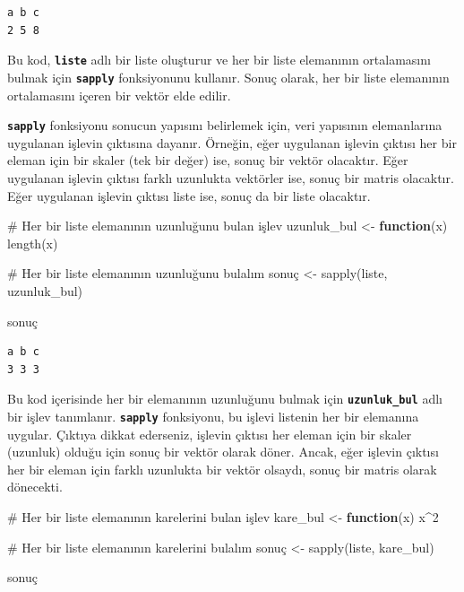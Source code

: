 \documentclass[
  letterpaper,
  DIV=11,
  numbers=noendperiod]{scrreprt}
\newenvironment{Shaded}{\begin{snugshade}}{\end{snugshade}}
\newcommand{\CommentTok}[1]{\textcolor[rgb]{0.37,0.37,0.37}{#1}}
\newcommand{\ControlFlowTok}[1]{\textcolor[rgb]{0.00,0.23,0.31}{\textbf{#1}}}
\newcommand{\DecValTok}[1]{\textcolor[rgb]{0.68,0.00,0.00}{#1}}
\newcommand{\FunctionTok}[1]{\textcolor[rgb]{0.28,0.35,0.67}{#1}}
\newcommand{\NormalTok}[1]{\textcolor[rgb]{0.00,0.23,0.31}{#1}}
\newcommand{\OtherTok}[1]{\textcolor[rgb]{0.00,0.23,0.31}{#1}}
\newcommand{\SpecialCharTok}[1]{\textcolor[rgb]{0.37,0.37,0.37}{#1}}
\begin{document}
\begin{verbatim}
a b c 
2 5 8 
\end{verbatim}

Bu kod, \textbf{\texttt{liste}} adlı bir liste oluşturur ve her bir
liste elemanının ortalamasını bulmak için \textbf{\texttt{sapply}}
fonksiyonunu kullanır. Sonuç olarak, her bir liste elemanının
ortalamasını içeren bir vektör elde edilir.

\textbf{\texttt{sapply}} fonksiyonu sonucun yapısını belirlemek için,
veri yapısının elemanlarına uygulanan işlevin çıktısına dayanır.
Örneğin, eğer uygulanan işlevin çıktısı her bir eleman için bir skaler
(tek bir değer) ise, sonuç bir vektör olacaktır. Eğer uygulanan işlevin
çıktısı farklı uzunlukta vektörler ise, sonuç bir matris olacaktır. Eğer
uygulanan işlevin çıktısı liste ise, sonuç da bir liste olacaktır.

\begin{Shaded}
\begin{Highlighting}[]
\CommentTok{\# Her bir liste elemanının uzunluğunu bulan işlev}
\NormalTok{uzunluk\_bul }\OtherTok{\textless{}{-}} \ControlFlowTok{function}\NormalTok{(x) }\FunctionTok{length}\NormalTok{(x)}

\CommentTok{\# Her bir liste elemanının uzunluğunu bulalım}
\NormalTok{sonuç }\OtherTok{\textless{}{-}} \FunctionTok{sapply}\NormalTok{(liste, uzunluk\_bul)}

\NormalTok{sonuç}
\end{Highlighting}
\end{Shaded}

\begin{verbatim}
a b c 
3 3 3 
\end{verbatim}

Bu kod içerisinde her bir elemanının uzunluğunu bulmak için
\textbf{\texttt{uzunluk\_bul}} adlı bir işlev tanımlanır.
\textbf{\texttt{sapply}} fonksiyonu, bu işlevi listenin her bir
elemanına uygular. Çıktıya dikkat ederseniz, işlevin çıktısı her eleman
için bir skaler (uzunluk) olduğu için sonuç bir vektör olarak döner.
Ancak, eğer işlevin çıktısı her bir eleman için farklı uzunlukta bir
vektör olsaydı, sonuç bir matris olarak dönecekti.

\begin{Shaded}
\begin{Highlighting}[]
\CommentTok{\# Her bir liste elemanının karelerini bulan işlev}
\NormalTok{kare\_bul }\OtherTok{\textless{}{-}} \ControlFlowTok{function}\NormalTok{(x) x}\SpecialCharTok{\^{}}\DecValTok{2}

\CommentTok{\# Her bir liste elemanının karelerini bulalım}
\NormalTok{sonuç }\OtherTok{\textless{}{-}} \FunctionTok{sapply}\NormalTok{(liste, kare\_bul)}

\NormalTok{sonuç}
\end{Highlighting}
\end{Shaded}
\end{document}
